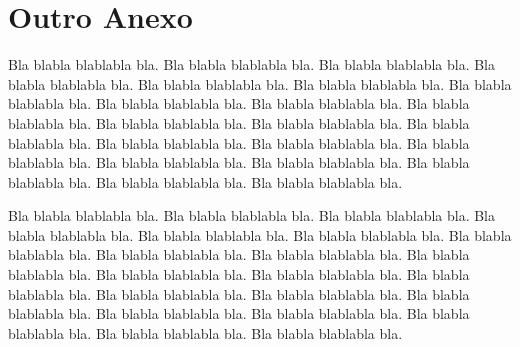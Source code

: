 \documentclass[diss,capa]{texufpel}
\begin{document}
\chapter{Outro Anexo}

Bla blabla blablabla bla.  Bla blabla blablabla bla.  Bla blabla
blablabla bla.  Bla blabla blablabla bla.  Bla blabla blablabla bla.
Bla blabla blablabla bla.  Bla blabla blablabla bla.  Bla blabla
blablabla bla.  Bla blabla blablabla bla.  Bla blabla blablabla bla.
Bla blabla blablabla bla.  Bla blabla blablabla bla.  Bla blabla
blablabla bla.  Bla blabla blablabla bla.  Bla blabla blablabla bla.
Bla blabla blablabla bla.  Bla blabla blablabla bla.  Bla blabla
blablabla bla.  Bla blabla blablabla bla.  Bla blabla blablabla bla.
Bla blabla blablabla bla.

Bla blabla blablabla bla.  Bla blabla blablabla bla.  Bla blabla
blablabla bla.  Bla blabla blablabla bla.  Bla blabla blablabla bla.
Bla blabla blablabla bla.  Bla blabla blablabla bla.  Bla blabla
blablabla bla.  Bla blabla blablabla bla.  Bla blabla blablabla bla.
Bla blabla blablabla bla.  Bla blabla blablabla bla.  Bla blabla
blablabla bla.  Bla blabla blablabla bla.  Bla blabla blablabla bla.
Bla blabla blablabla bla.  Bla blabla blablabla bla.  Bla blabla
blablabla bla.  Bla blabla blablabla bla.  Bla blabla blablabla bla.
Bla blabla blablabla bla.

\end{document}
